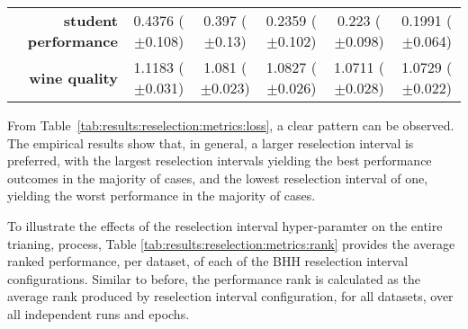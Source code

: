 \begin{table}[htb]
{\begin{tabular}{r|ccccc}
			\textbf{student performance} & \cellcolor[rgb]{ .973,  .412,  .42}0.4376 ($\pm$0.108)       & \cellcolor[rgb]{ .98,  .518,  .443}0.397 ($\pm$0.13)    & \cellcolor[rgb]{ 1,  .922,  .518}0.2359 ($\pm$0.102)    & \cellcolor[rgb]{ .784,  .859,  .502}0.223 ($\pm$0.098)  & \cellcolor[rgb]{ .388,  .745,  .482}0.1991 ($\pm$0.064) \\
			\textbf{wine quality}        & \cellcolor[rgb]{ .973,  .412,  .42}1.1183 ($\pm$0.031)       & \cellcolor[rgb]{ 1,  .922,  .518}1.081 ($\pm$0.023)     & \cellcolor[rgb]{ 1,  .898,  .514}1.0827 ($\pm$0.026)    & \cellcolor[rgb]{ .388,  .745,  .482}1.0711 ($\pm$0.028) & \cellcolor[rgb]{ .498,  .776,  .486}1.0729 ($\pm$0.022) \\
		\end{tabular}%
	}
\end{table}%

From Table~\ref{tab:results:reselection:metrics:loss}, a clear pattern can be observed. The empirical results show that, in general, a larger reselection interval is preferred, with the largest reselection intervals yielding the best performance outcomes in the majority of cases, and the lowest reselection interval of one, yielding the worst performance in the majority of cases.

To illustrate the effects of the reselection interval hyper-paramter on the entire trianing, process, Table \ref{tab:results:reselection:metrics:rank} provides the average ranked performance, per dataset, of each of the \acs{BHH} reselection interval configurations. Similar to before, the performance rank is calculated as the average rank produced by reselection interval configuration, for all datasets, over all independent runs and epochs.

